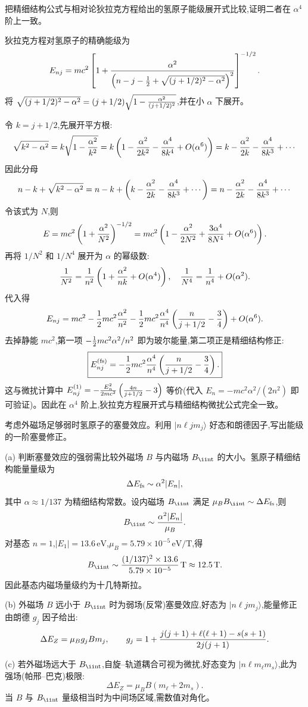 \begin{question}
把精细结构公式与相对论狄拉克方程给出的氢原子能级展开式比较,证明二者在 $\alpha^4$ 阶上一致。
\end{question}
\begin{solution}
狄拉克方程对氢原子的精确能级为
\[
E_{nj}=mc^2\left[1+{\alpha^2\over\left(n-j-{1\over2}+\sqrt{(j+1/2)^2-\alpha^2}\right)^2}\right]^{-1/2}.
\]
将 $\sqrt{(j+1/2)^2-\alpha^2}=(j+1/2)\sqrt{1-{\alpha^2\over(j+1/2)^2}}$,并在小 $\alpha$ 下展开。

令 $k=j+1/2$,先展开平方根:
\[
\sqrt{k^2-\alpha^2}=k\sqrt{1-{\alpha^2\over k^2}}
=k\left(1-{\alpha^2\over2k^2}-{\alpha^4\over8k^4}+O(\alpha^6)\right)
=k-{\alpha^2\over2k}-{\alpha^4\over8k^3}+\cdots
\]
因此分母
\[
n-k+\sqrt{k^2-\alpha^2} = n-k+\left(k-{\alpha^2\over2k}-{\alpha^4\over8k^3}+\cdots\right)
=n-{\alpha^2\over2k}-{\alpha^4\over8k^3}+\cdots
\]
令该式为 $N$,则
\[
E = mc^2\left(1+{\alpha^2\over N^2}\right)^{-1/2}
= mc^2\left(1-{\alpha^2\over2N^2}+{3\alpha^4\over8N^4}+O(\alpha^6)\right).
\]
再将 $1/N^2$ 和 $1/N^4$ 展开为 $\alpha$ 的幂级数:
\[
{1\over N^2} = {1\over n^2}\left(1+{\alpha^2\over nk}+O(\alpha^4)\right),\quad
{1\over N^4} = {1\over n^4}+O(\alpha^2).
\]
代入得
\[
E_{nj}=mc^2-{1\over2}mc^2{\alpha^2\over n^2}
-{1\over2}mc^2{\alpha^4\over n^4}\left({n\over j+1/2}-{3\over4}\right)+O(\alpha^6).
\]
去掉静能 $mc^2$,第一项 $-{1\over2}mc^2\alpha^2/n^2$ 即为玻尔能量,第二项正是精细结构修正:
\[
\boxed{E_{nj}^{\text{(fs)}}=-{1\over2}mc^2{\alpha^4\over n^4}\left({n\over j+1/2}-{3\over4}\right).}
\]
这与微扰计算中 $E_{nj}^{(1)}=-{E_n^2\over2mc^2}\left({4n\over j+1/2}-3\right)$ 等价(代入 $E_n=-mc^2\alpha^2/(2n^2)$ 即可验证)。因此在 $\alpha^4$ 阶上,狄拉克方程展开式与精细结构微扰公式完全一致。
\end{solution}

\begin{question}
考虑外磁场足够弱时氢原子的塞曼效应。利用 $|n\ell jm_j\rangle$ 好态和朗德因子,写出能级的一阶塞曼修正。
\end{question}
\begin{solution}
(a) 判断塞曼效应的强弱需比较外磁场 $B$ 与内磁场 $B_{\rm \ii nt}$ 的大小。氢原子精细结构能量量级为
\[
\Delta E_{\rm fs}\sim \alpha^2 |E_n|,
\]
其中 $\alpha\approx1/137$ 为精细结构常数。设内磁场 $B_{\rm \ii nt}$ 满足 $\mu_B B_{\rm \ii nt}\sim\Delta E_{\rm fs}$,则
\[
B_{\rm \ii nt}\sim {\alpha^2|E_n|\over\mu_B}.
\]
对基态 $n=1$,$|E_1|=13.6\,\mathrm{eV}$,$\mu_B=5.79\times10^{-5}\,\mathrm{eV/T}$,得
\[
B_{\rm \ii nt}\sim {(1/137)^2\times13.6\over5.79\times10^{-5}}\,\mathrm{T}
\approx 12.5\,\mathrm{T}.
\]
因此基态内磁场量级约为十几特斯拉。

(b) 外磁场 $B$ 远小于 $B_{\rm \ii nt}$ 时为弱场(反常)塞曼效应,好态为 $|n\ell j m_j\rangle$,能量修正由朗德 $g_j$ 因子给出:
\[
\Delta E_Z = \mu_B g_j B m_j,\qquad
g_j=1+{j(j+1)+\ell(\ell+1)-s(s+1)\over2j(j+1)}.
\]

(c) 若外磁场远大于 $B_{\rm \ii nt}$,自旋--轨道耦合可视为微扰,好态变为 $|n\ell m_\ell m_s\rangle$,此为强场(帕邢--巴克)极限:
\[
\Delta E_Z = \mu_B B(m_\ell+2m_s).
\]
当 $B$ 与 $B_{\rm \ii nt}$ 量级相当时为中间场区域,需数值对角化。
\end{solution}

